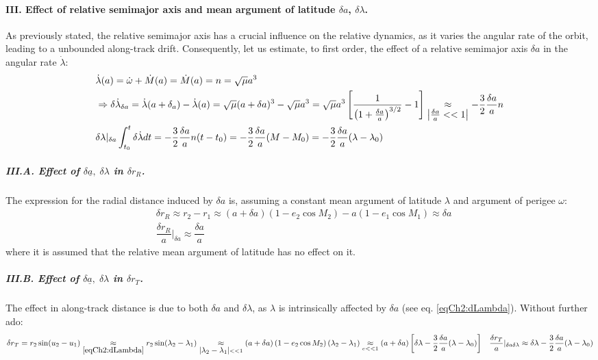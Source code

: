 			\paragraph{\textcolor{GMVred}{III.} Effect of relative semimajor axis and mean argument of latitude $\delta a$, $\delta \lambda$. \\}
			\indent As previously stated, the relative semimajor axis has a crucial influence on the relative dynamics, as it varies the angular rate of the orbit, leading to a unbounded along-track drift. Consequently, let us estimate, to first order, the effect of a relative semimajor axis $\delta a$ in the angular rate $\dot{\lambda}$:
			\begin{align}
			&\nonumber \dot{\lambda}(a) = \dot{\omega} + \dot{M}(a) = \dot{M}(a) = n = \displaystyle\sqrt{\mu}{a^3} \\
			& \nonumber \Rightarrow \delta\dot{\lambda}_{\delta a} = \dot{\lambda}(a + \delta_a) - \dot{\lambda}(a) =\displaystyle\sqrt{\mu}{(a + \delta a)^3} - \displaystyle\sqrt{\mu}{a^3} = \displaystyle\sqrt{\mu}{a^3}\left[ \dfrac{1}{\left(1 + \frac{\delta a}{a}\right)^{3/2}} - 1\right] \underset{\mbox{$\left\lvert \frac{\delta a}{a}<<1 \right\rvert$}}{\approx} - \dfrac{3}{2}\dfrac{\delta a}{a} n\\
			& \label{eqCh2:dLambda} \delta \lambda\rvert_{\delta a} \displaystyle\int_{t_0}^{t} \delta \dot{\lambda} dt = - \dfrac{3}{2}\dfrac{\delta a}{a} n (t - t_0) = - \dfrac{3}{2}\dfrac{\delta a}{a} (M - M_0) = - \dfrac{3}{2}\dfrac{\delta a}{a} (\lambda - \lambda_0)
			\end{align}
			\subparagraph{\textcolor{GMVred}{III.A.} Effect of $\delta \underline{a}, \; \delta \lambda$ in $\delta r_R$. \\}
			\indent The expression for the radial distance induced by $\delta a$ is, assuming a constant mean argument of latitude $\lambda$ and argument of perigee $\omega$:
			\begin{align}
			&\nonumber \delta r_R \approx r_2 - r_1 \approx (a + \delta a) (1 - e_2 \cos M_2) - a (1 - e_1 \cos M_1) \approx \delta a \\
			& \label{eqCh2:r_R_a} \dfrac{\delta r_R}{a}\rvert_{\delta a} \approx \dfrac{\delta a}{a}
			\end{align}
			\noindent where it is assumed that the relative mean argument of latitude has no effect on it.
			\subparagraph{\textcolor{GMVred}{III.B.} Effect of $\delta \underline{a}, \; \delta \lambda$ in $\delta r_T$. \\}
			\indent The effect in along-track distance is due to both $\delta a$ and $\delta \lambda$, as $\lambda$ is intrinsically affected by $\delta a$ (see eq. \eqref{eqCh2:dLambda}). Without further ado:
			\begin{align}
			&\nonumber \delta r_T = r_2 \sin(u_2 - u_1) \underset{\eqref{eqCh2:dLambda}}{\approx} r_2 \sin(\lambda_2 - \lambda_1) \underset{\mbox{$\left\lvert \lambda_2 - \lambda_1 \right\rvert$} << 1}{\approx} (a + \delta a) \left(1 - e_2 \cos M_2\right) (\lambda_2 - \lambda_1) \underset{e<<1}{\approx} (a + \delta a) \left[\delta \lambda - \dfrac{3}{2}\dfrac{\delta a}{a} (\lambda - \lambda_0) \right] 
			& \label{eqCh2:r_T_a_lam} \dfrac{\delta r_T}{a}\rvert_{\delta a \delta\lambda} \approx \delta\lambda - \dfrac{3}{2}\dfrac{\delta a}{a} (\lambda - \lambda_0)
			\end{align}
